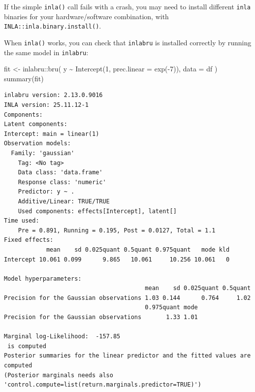 \documentclass[
  letterpaper,
  DIV=11,
  numbers=noendperiod]{scrartcl}
\newenvironment{Shaded}{\begin{snugshade}}{\end{snugshade}}
\newcommand{\AttributeTok}[1]{\textcolor[rgb]{0.40,0.45,0.13}{#1}}
\newcommand{\DecValTok}[1]{\textcolor[rgb]{0.68,0.00,0.00}{#1}}
\newcommand{\FunctionTok}[1]{\textcolor[rgb]{0.28,0.35,0.67}{#1}}
\newcommand{\NormalTok}[1]{\textcolor[rgb]{0.00,0.23,0.31}{#1}}
\newcommand{\OtherTok}[1]{\textcolor[rgb]{0.00,0.23,0.31}{#1}}
\newcommand{\SpecialCharTok}[1]{\textcolor[rgb]{0.37,0.37,0.37}{#1}}
\begin{document}
If the simple \texttt{inla()} call fails with a crash, you may need to
install different \texttt{inla} binaries for your hardware/software
combination, with \texttt{INLA::inla.binary.install()}.

When \texttt{inla()} works, you can check that \texttt{inlabru} is
installed correctly by running the same model in \texttt{inlabru}:

\begin{Shaded}
\begin{Highlighting}[]
\NormalTok{fit }\OtherTok{\textless{}{-}}\NormalTok{ inlabru}\SpecialCharTok{::}\FunctionTok{bru}\NormalTok{(}
\NormalTok{  y }\SpecialCharTok{\textasciitilde{}} \FunctionTok{Intercept}\NormalTok{(}\DecValTok{1}\NormalTok{, }\AttributeTok{prec.linear =} \FunctionTok{exp}\NormalTok{(}\SpecialCharTok{{-}}\DecValTok{7}\NormalTok{)),}
  \AttributeTok{data =}\NormalTok{ df}
\NormalTok{)}
\FunctionTok{summary}\NormalTok{(fit)}
\end{Highlighting}
\end{Shaded}

\begin{verbatim}
inlabru version: 2.13.0.9016 
INLA version: 25.11.12-1 
Components: 
Latent components:
Intercept: main = linear(1)
Observation models: 
  Family: 'gaussian'
    Tag: <No tag>
    Data class: 'data.frame'
    Response class: 'numeric'
    Predictor: y ~ .
    Additive/Linear: TRUE/TRUE
    Used components: effects[Intercept], latent[] 
Time used:
    Pre = 0.891, Running = 0.195, Post = 0.0127, Total = 1.1 
Fixed effects:
            mean    sd 0.025quant 0.5quant 0.975quant   mode kld
Intercept 10.061 0.099      9.865   10.061     10.256 10.061   0

Model hyperparameters:
                                        mean    sd 0.025quant 0.5quant
Precision for the Gaussian observations 1.03 0.144      0.764     1.02
                                        0.975quant mode
Precision for the Gaussian observations       1.33 1.01

Marginal log-Likelihood:  -157.85 
 is computed 
Posterior summaries for the linear predictor and the fitted values are computed
(Posterior marginals needs also 'control.compute=list(return.marginals.predictor=TRUE)')
\end{verbatim}
\end{document}
